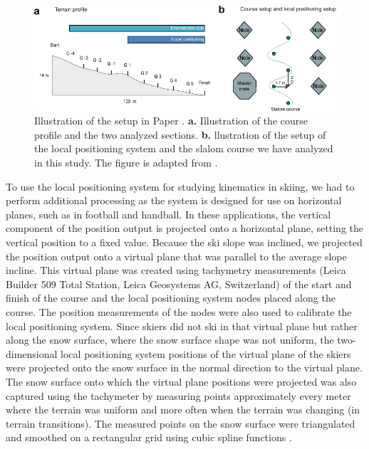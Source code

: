 \begin{figure}
    \centering
    \includegraphics[width=1\linewidth]{figure/figure_methods_LPSoverview.pdf}
    \caption[Illustration of the setup in Paper ]{Illustration of the setup in Paper . \textbf{a.} Illustration of the course profile and the two analyzed sections. \textbf{b.} llustration of the setup of the local positioning system and the slalom course we have analyzed in this study. The figure is adapted from \textcite{magelssen_kinematic_2024}.}
    \label{fig: lps}
\end{figure}

To use the local positioning system for studying kinematics in skiing, we had to perform additional processing as the system is designed for use on horizontal planes, such as in football and handball. In these applications, the vertical component of the position output is projected onto a horizontal plane, setting the vertical position to a fixed value. Because the ski slope was inclined, we projected the position output onto a virtual plane that was parallel to the average slope incline. This virtual plane was created using tachymetry measurements (Leica Builder 509 Total Station, Leica Geosystems AG, Switzerland) of the start and finish of the course and the local positioning system nodes placed along the course. The position measurements of the nodes were also used to calibrate the local positioning system. Since skiers did not ski in that virtual plane but rather along the snow surface, where the snow surface shape was not uniform, the two-dimensional local positioning system positions of the virtual plane of the skiers were projected onto the snow surface in the normal direction to the virtual plane. The snow surface onto which the virtual plane positions were projected was also captured using the tachymeter by measuring points approximately every meter where the terrain was uniform and more often when the terrain was changing (in terrain transitions). The measured points on the snow surface were triangulated and smoothed on a rectangular grid using cubic spline functions  \cite{gilgien_determination_2013}. 

